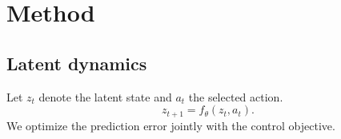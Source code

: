 \section{Method}
\subsection{Latent dynamics}
Let \(z_t\) denote the latent state and \(a_t\) the selected action.
\begin{equation}
z_{t+1} = f_\theta(z_t, a_t).
\end{equation}
We optimize the prediction error jointly with the control objective.
